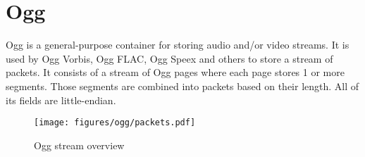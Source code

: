 
\chapter{Ogg}
\label{ogg}
Ogg is a general-purpose container for storing audio and/or video streams.
It is used by Ogg Vorbis, Ogg FLAC, Ogg Speex and others
to store a stream of packets.
It consists of a stream of Ogg pages where each page stores
1 or more segments.
Those segments are combined into packets based on their length.
All of its fields are little-endian.
\begin{figure}[h]
  \texttt{[image: figures/ogg/packets.pdf]}
  \caption{Ogg stream overview}
\end{figure}

\clearpage


